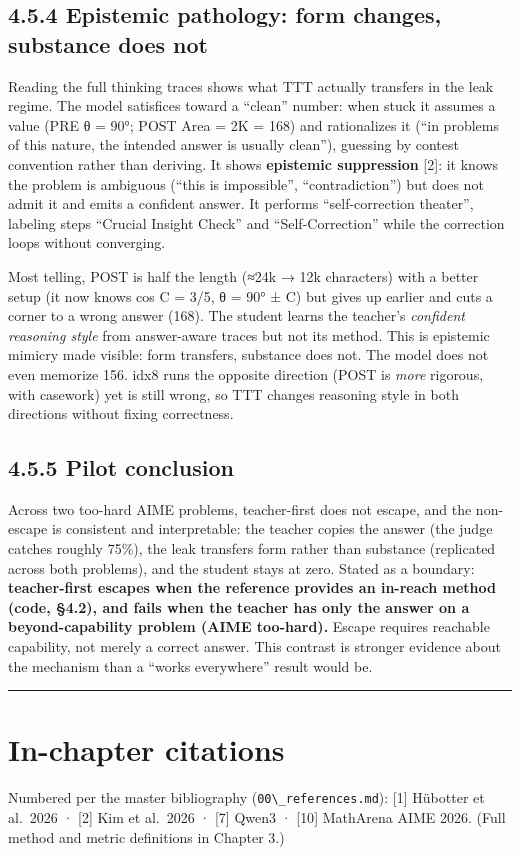 \subsection{4.5.4 Epistemic pathology: form changes, substance does not}\label{epistemic-pathology-form-changes-substance-does-not}

Reading the full thinking traces shows what TTT actually transfers in the leak regime. The model satisfices toward a ``clean'' number: when stuck it assumes a value (PRE θ = 90°; POST Area = 2K = 168) and rationalizes it (``in problems of this nature, the intended answer is usually clean''), guessing by contest convention rather than deriving. It shows \textbf{epistemic suppression} {[}2{]}: it knows the problem is ambiguous (``this is impossible'', ``contradiction'') but does not admit it and emits a confident answer. It performs ``self-correction theater'', labeling steps ``Crucial Insight Check'' and ``Self-Correction'' while the correction loops without converging.

Most telling, POST is half the length (≈24k → 12k characters) with a better setup (it now knows cos C = 3/5, θ = 90° ± C) but gives up earlier and cuts a corner to a wrong answer (168). The student learns the teacher's \emph{confident reasoning style} from answer-aware traces but not its method. This is epistemic mimicry made visible: form transfers, substance does not. The model does not even memorize 156. idx8 runs the opposite direction (POST is \emph{more} rigorous, with casework) yet is still wrong, so TTT changes reasoning style in both directions without fixing correctness.

\subsection{4.5.5 Pilot conclusion}\label{pilot-conclusion}

Across two too-hard AIME problems, teacher-first does not escape, and the non-escape is consistent and interpretable: the teacher copies the answer (the judge catches roughly 75\%), the leak transfers form rather than substance (replicated across both problems), and the student stays at zero. Stated as a boundary: \textbf{teacher-first escapes when the reference provides an in-reach method (code, §4.2), and fails when the teacher has only the answer on a beyond-capability problem (AIME too-hard).} Escape requires reachable capability, not merely a correct answer. This contrast is stronger evidence about the mechanism than a ``works everywhere'' result would be.

\begin{center}\rule{0.5\linewidth}{0.5pt}\end{center}

\section{In-chapter citations}\label{in-chapter-citations}

Numbered per the master bibliography (\passthrough{\lstinline!00\_references.md!}): {[}1{]} Hübotter et al.~2026 · {[}2{]} Kim et al.~2026 · {[}7{]} Qwen3 · {[}10{]} MathArena AIME 2026. (Full method and metric definitions in Chapter 3.)

